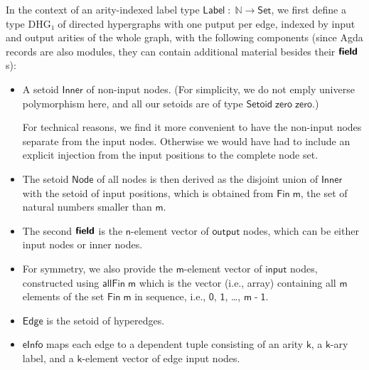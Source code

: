 \documentclass[copyright]{eptcs}
\newcommand{\Conid}[1]{\mathit{#1}}
\newcommand{\Varid}[1]{\mathit{#1}}
\renewcommand\Varid[1]{\mathord{\textsf{#1}}}
\let\Conid\Varid
\newcommand\Keyword[1]{\textsf{\textbf{#1}}}
\newcounter{x}
\newcounter{y}
\newcounter{z}
\begin{document}
In the context of an arity-indexed label type \ensuremath{\Conid{Label}\;\mathbin{:}\;\Conid{ℕ}\;\Varid{→}\;\Conid{Set}},
we first define a type \ensuremath{\Conid{DHG₁}} of directed hypergraphs with one putput
per edge, indexed by input and output arities of the whole graph,
with the following components (since Agda records are also modules,
they can contain additional material besides their \ensuremath{\Keyword{field}}s):
\begin{itemize}
\item A setoid \ensuremath{\Conid{Inner}} of non-input nodes. (For simplicity, we do not
  emply universe polymorphism here, and all our setoids are of type
  \ensuremath{\Conid{Setoid}\;\Varid{zero}\;\Varid{zero}}.)

  For technical reasons, we find it more convenient
  to have the non-input nodes separate from the input nodes.
  Otherwise we would have had to include an explicit injection
  from the input positions to the complete node set.

\item The setoid \ensuremath{\Conid{Node}} of all nodes is then derived as the disjoint
  union of \ensuremath{\Conid{Inner}} with the setoid of input positions,
  which is obtained from \ensuremath{\Conid{Fin}\;\Varid{m}}, the set of natural numbers smaller
  than \ensuremath{\Varid{m}}.

\item The second \ensuremath{\Keyword{field}} is the \ensuremath{\Varid{n}}-element vector of \ensuremath{\Varid{output}} nodes,
  which can be either input nodes or inner nodes.

\item For symmetry, we also provide the \ensuremath{\Varid{m}}-element vector of \ensuremath{\Varid{input}}
  nodes, constructed using \ensuremath{\Varid{allFin}\;\Varid{m}} which is the vector (i.e.,
  array) containing all \ensuremath{\Varid{m}} elements of the set \ensuremath{\Conid{Fin}\;\Varid{m}} in sequence,
  i.e., \ensuremath{\Varid{0}}, \ensuremath{\Varid{1}}, \ldots, \ensuremath{\Varid{m}\;\Varid{-}\;\Varid{1}}.

\item \ensuremath{\Conid{Edge}} is the setoid of hyperedges.

\item \ensuremath{\Varid{eInfo}} maps each edge to a dependent tuple
  consisting of an arity \ensuremath{\Varid{k}}, a \ensuremath{\Varid{k}}-ary label, and a \ensuremath{\Varid{k}}-element
  vector of edge input nodes.


\end{itemize}
\end{document}
